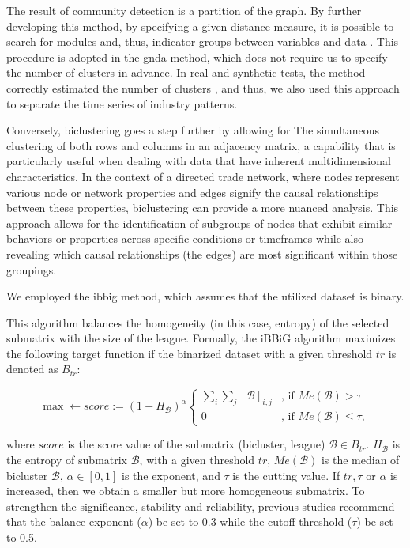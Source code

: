 \documentclass[preprint, 3p,
authoryear]{elsarticle} %
\begin{document}
The result of community detection is a partition of the graph. By
further developing this method, by specifying a given distance measure,
it is possible to search for modules and, thus, indicator groups between
variables and data \citep{kosztyan2022network}. This procedure is
adopted in the \gls{gnda} method, which does not require us to specify
the number of clusters in advance. In real and synthetic tests, the
method correctly estimated the number of clusters
\citep{kosztyan2024generalized}, and thus, we also used this approach to
separate the time series of industry patterns.

Conversely, biclustering goes a step further by allowing for The
simultaneous clustering of both rows and columns in an adjacency matrix,
a capability that is particularly useful when dealing with data that
have inherent multidimensional characteristics. In the context of a
directed trade network, where nodes represent various node or network
properties and edges signify the causal relationships between these
properties, biclustering can provide a more nuanced analysis. This
approach allows for the identification of subgroups of nodes that
exhibit similar behaviors or properties across specific conditions or
timeframes while also revealing which causal relationships (the edges)
are most significant within those groupings.

We employed the \gls{ibbig} method, which assumes that the utilized
dataset is binary.

This algorithm balances the homogeneity (in this case, entropy) of the
selected submatrix with the size of the league. Formally, the iBBiG
algorithm maximizes the following target function if the binarized
dataset with a given threshold \(tr\) is denoted as \(B_{tr}\):

\begin{equation}\label{eq:iBBiG}
    \max \leftarrow score:=(1-H_{\mathcal{B}})^{\alpha}\left\{
    \begin{array}{cl}
    \sum_{i}{\sum_{j}{[\mathcal{B}]_{i,j}}}&\textrm{, if }Me(\mathcal{B})>\tau\\
    0&\textrm{, if }Me(\mathcal{B})\leq \tau,
    \end{array}\right.
\end{equation}

\noindent  where \(score\) is the score value of the submatrix
(bicluster, league) \(\mathcal{B}\in B_{tr}\). \(H_{\mathcal{B}}\) is
the entropy of submatrix \(\mathcal{B}\), with a given threshold \(tr\),
\(Me(\mathcal{B})\) is the median of bicluster \(\mathcal{B}\),
\(\alpha \in[0,1]\) is the exponent, and \(\tau\) is the cutting value.
If \(tr, \tau\) or \(\alpha\) is increased, then we obtain a smaller but
more homogeneous submatrix. To strengthen the significance, stability
and reliability, previous studies
\citep[see, e.g.,][]{Gusenleitner2012iBBiG,kosztyanrankings2019}
recommend that the balance exponent (\(\alpha\)) be set to 0.3 while the
cutoff threshold (\(\tau\)) be set to 0.5.
\end{document}
